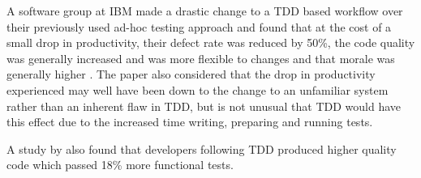 A software group at IBM made a drastic change to a TDD based workflow over their previously used ad-hoc testing approach and found that at the cost of a small drop in productivity, their defect rate was reduced by 50\%, the code quality was generally increased and was more flexible to changes and that morale was generally higher \citep{IBMTDD}. 
The paper also considered that the drop in productivity experienced may well have been down to the change to an unfamiliar system rather than an inherent flaw in TDD, but is not unusual that TDD would have this effect due to the increased time writing, preparing and running tests.

A study by \cite{George:2003:IIT:952532.952753} also found that developers following TDD produced higher quality code which passed 18\% more functional tests.